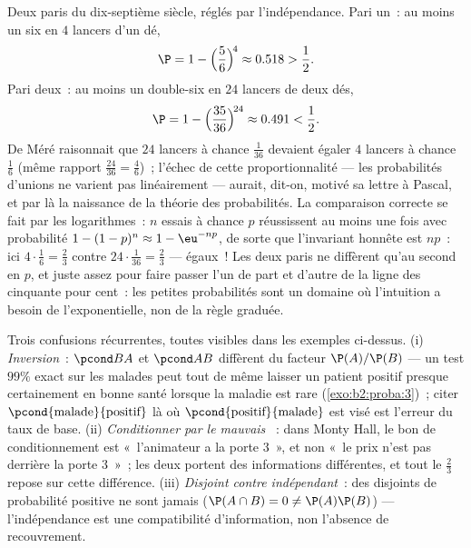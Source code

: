 \begin{example}\label{ex:b2:proba:demere}
Deux paris du dix-septième siècle, réglés par l'indépendance. Pari
un~: au moins un six en $4$ lancers d'un dé,
\[
\P = 1 - \Bigl(\frac56\Bigr)^{\!4} \approx 0.518 > \frac12 .
\]
Pari deux~: au moins un double-six en $24$ lancers de deux dés,
\[
\P = 1 - \Bigl(\frac{35}{36}\Bigr)^{\!24} \approx 0.491 <
\frac12 .
\]
De Méré raisonnait que $24$ lancers à chance $\frac1{36}$
devaient égaler $4$ lancers à chance $\frac16$ (même rapport
$\frac{24}{36} = \frac46$)~; l'échec de cette
proportionnalité --- les probabilités d'unions ne varient pas
linéairement --- aurait, dit-on, motivé sa lettre à Pascal,
et par là la naissance de la théorie des probabilités. La comparaison
correcte se fait par les logarithmes~: $n$ essais à chance $p$
réussissent au moins une fois avec probabilité $1 - (1-p)^n \approx
1 - \eu^{-np}$, de sorte que l'invariant honnête est $np$~: ici
$4\cdot\frac16 = \frac23$ contre $24\cdot\frac1{36} =
\frac23$ --- égaux~! Les deux paris ne diffèrent qu'au second
 en $p$, et juste assez pour faire passer l'un de part et d'autre de
la ligne des cinquante pour cent~: les petites probabilités sont un domaine où
l'intuition a besoin de l'exponentielle, non de la règle graduée.
\end{example}

\begin{remark}
Trois confusions récurrentes, toutes visibles dans les exemples
ci-dessus. (i) \emph{Inversion}~: $\pcond BA$ et $\pcond AB$
diffèrent du facteur $\P(A)/\P(B)$ --- un test
$99\%$ exact sur les malades peut tout de même laisser un patient positif
presque certainement en bonne santé lorsque la maladie est rare
(\cref{exo:b2:proba:3})~; citer $\pcond{\text{malade}}{
\text{positif}}$ là où $\pcond{\text{positif}}{
\text{malade}}$ est visé est l'erreur du taux de base. (ii)
\emph{Conditionner par le mauvais }~: dans Monty Hall, le
bon  de conditionnement est «~l'animateur a  la porte $3$~»,
et non «~le prix n'est pas derrière la porte $3$~»~; les deux portent
des informations différentes, et tout le $\frac23$ repose sur cette
différence. (iii) \emph{Disjoint contre indépendant}~:
des  disjoints de probabilité positive ne sont jamais
 ($\P(A\cap B) = 0 \neq \P(A)\P(B)$) ---
l'indépendance est une compatibilité d'information, non l'absence de
recouvrement.
\end{remark}

